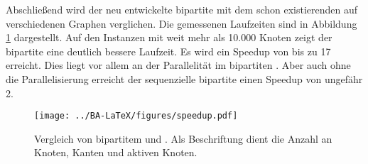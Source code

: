 Abschließend wird der neu entwickelte bipartite \gc{} mit dem schon existierenden \cb{} auf verschiedenen Graphen verglichen.
Die gemessenen Laufzeiten sind in Abbildung \ref{fig:speedup_komplett} dargestellt. Auf den Instanzen mit 
weit mehr als 10.000 Knoten zeigt der bipartite \gc{} eine deutlich bessere Laufzeit. Es wird ein Speedup von 
bis zu 17 erreicht. Dies liegt vor allem an der Parallelität im bipartiten \gc{}. Aber auch ohne
die Parallelisierung erreicht der sequenzielle bipartite \gc{} einen Speedup von ungefähr 2.



\begin{figure}[H]
\centering
	\texttt{[image: ../BA-LaTeX/figures/speedup.pdf]}
	\caption[Laufzeitvergleich von bipartitem \gc{} und einer abgeänderten Variante von \cb{}]
	{Vergleich von bipartitem \gc{} und \cb{}.
	Als Beschriftung dient die Anzahl an Knoten, Kanten und aktiven Knoten.}
	\label{fig:speedup_komplett}
\end{figure} 
   
